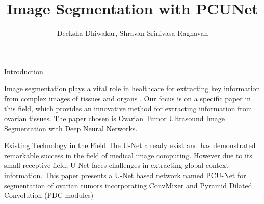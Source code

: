 \documentclass{beamer}
\title{Image Segmentation with PCUNet}
\author{Deeksha Dhiwakar, Shravan Srinivasa Raghavan}
\begin{document}
\maketitle
\begin{frame}{Introduction}
    
Image segmentation plays a vital role in healthcare for extracting key information from complex images of tissues and organs .
Our focus is on a specific paper in this field, which provides an innovative method for extracting information from
ovarian tissues. The paper chosen is Ovarian Tumor Ultrasound Image Segmentation
with Deep Neural Networks.
\end{frame}
\begin{frame}{Existing Technology in the Field}
    The U-Net already exist and has demonstrated remarkable success in the field of medical image computing. However due to its
    small receptive field, U-Net faces challenges in extracting global context information. This paper presents a U-Net based
    network named PCU-Net for segmentation of ovarian tumors incorporating ConvMixer and Pyramid Dilated Convolution (PDC modules)

\end{frame}
\end{document}
